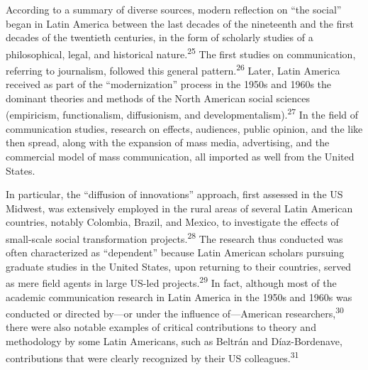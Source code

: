 \documentclass{tufte-handout}
\begin{document}
According to a summary of diverse sources, modern reflection on ``the
social'' began in Latin America between the last decades of the
nineteenth and the first decades of the twentieth centuries, in the form
of scholarly studies of a philosophical, legal, and historical
nature.\textsuperscript{25} The first studies on communication, referring to
journalism, followed this general pattern.\textsuperscript{26} Later, Latin America received
as part of the ``modernization'' process in the 1950s and 1960s the
dominant theories and methods of the North American social sciences
(empiricism, functionalism, diffusionism, and
developmentalism).\textsuperscript{27} In the field of
communication studies, research on effects, audiences, public opinion,
and the like then spread, along with the expansion of mass media,
advertising, and the commercial model of mass communication, all
imported as well from the United States.

In particular, the ``diffusion of innovations'' approach, first assessed
in the US Midwest, was extensively employed in the rural areas of
several Latin American countries, notably Colombia, Brazil, and Mexico,
to investigate the effects of small-scale social transformation
projects.\textsuperscript{28} The research thus conducted
was often characterized as ``dependent'' because Latin American scholars
pursuing graduate studies in the United States, upon returning to their
countries, served as mere field agents in large US-led
projects.\textsuperscript{29} In fact, although most of the academic
communication research in Latin America in the 1950s and 1960s was
conducted or directed by---or under the influence of---American
researchers,\textsuperscript{30} there were also
notable examples of critical contributions to theory and methodology by
some Latin Americans, such as Beltrán and Díaz-Bordenave, contributions
that were clearly recognized by their US colleagues.\textsuperscript{31}
\end{document}
